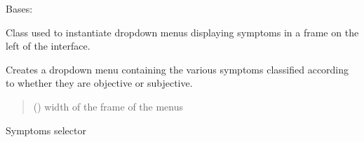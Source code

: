 \documentclass[letterpaper,10pt,english]{sphinxmanual}
\begin{document}
\begin{fulllineitems}
\label{\detokenize{general_interface:general_interface_V10.Menu_symptomes}}
\pysigstartsignatures
{}
\pysigstopsignatures
\sphinxAtStartPar
Bases: 

\sphinxAtStartPar
Class used to instantiate drop\sphinxhyphen{}down menus displaying symptoms in a frame on the left of the interface.

\begin{fulllineitems}
\label{\detokenize{general_interface:general_interface_V10.Menu_symptomes.create_dropdown_menus}}
\pysigstartsignatures
{}
\pysigstopsignatures
\sphinxAtStartPar
Creates a drop\sphinxhyphen{}down menu containing the various symptoms classified according to whether they are objective or subjective.
\begin{quote}\begin{description}
\sphinxAtStartPar
{} () \textendash{} width of the frame of the menus

\end{description}\end{quote}

\end{fulllineitems}


\begin{fulllineitems}
\label{\detokenize{general_interface:general_interface_V10.Menu_symptomes.on_select}}
\pysigstartsignatures
{}
\pysigstopsignatures
\sphinxAtStartPar
Symptoms selector


\end{fulllineitems}
\end{fulllineitems}
\end{document}
